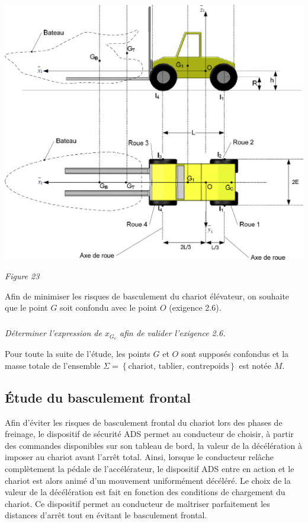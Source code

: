 \documentclass[10pt,fleqn]{article} %
\begin{document}
\begin{center}
\includegraphics[width=.8\linewidth]{images/fig_23}

\textit{Figure 23}
\end{center}

Afin de minimiser les risques de basculement du chariot élévateur, on souhaite que le point $G$ soit confondu avec le point $O$ (exigence 2.6).

\subparagraph{}
\textit{Déterminer l’expression de $x_{G_c}$ afin de valider l'exigence 2.6.}

Pour toute la suite de l’étude, les points $G$ et $O$ sont supposés confondus et la masse totale de l’ensemble $\Sigma=\left\{\text{chariot, tablier, contrepoids}\right\}$ est notée $M$.

\subsection{Étude du basculement frontal}

Afin d’éviter les risques de basculement frontal du chariot lors des phases de freinage, le dispositif de sécurité ADS permet au conducteur de choisir, à partir des commandes disponibles sur son tableau de bord, la valeur de la décélération à imposer au chariot avant l’arrêt total. Ainsi, lorsque le conducteur relâche complètement la pédale de l’accélérateur, le dispositif ADS entre en action et le chariot est alors animé d’un mouvement uniformément décéléré. Le choix de la valeur de la décélération est fait en fonction des conditions de chargement du chariot. Ce dispositif permet au conducteur de maîtriser parfaitement les distances d’arrêt tout en évitant le basculement frontal.
\end{document}
